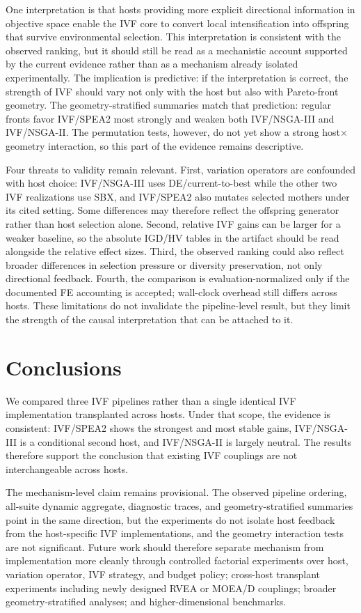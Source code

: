\documentclass[runningheads]{llncs}
\begin{document}
One interpretation is that hosts providing more explicit directional information in objective space enable the IVF core to convert local intensification into offspring that survive environmental selection. This interpretation is consistent with the observed ranking, but it should still be read as a mechanistic account supported by the current evidence rather than as a mechanism already isolated experimentally. The implication is predictive: if the interpretation is correct, the strength of IVF should vary not only with the host but also with Pareto-front geometry. The geometry-stratified summaries match that prediction: regular fronts favor IVF/SPEA2 most strongly and weaken both IVF/NSGA-III and IVF/NSGA-II. The permutation tests, however, do not yet show a strong host$\times$geometry interaction, so this part of the evidence remains descriptive.

Four threats to validity remain relevant. First, variation operators are confounded with host choice: IVF/NSGA-III uses DE/current-to-best while the other two IVF realizations use SBX, and IVF/SPEA2 also mutates selected mothers under its cited setting. Some differences may therefore reflect the offspring generator rather than host selection alone. Second, relative IVF gains can be larger for a weaker baseline, so the absolute IGD/HV tables in the artifact should be read alongside the relative effect sizes. Third, the observed ranking could also reflect broader differences in selection pressure or diversity preservation, not only directional feedback. Fourth, the comparison is evaluation-normalized only if the documented FE accounting is accepted; wall-clock overhead still differs across hosts. These limitations do not invalidate the pipeline-level result, but they limit the strength of the causal interpretation that can be attached to it.

\section{Conclusions}
\label{sec:conclusion}

We compared three IVF pipelines rather than a single identical IVF implementation transplanted across hosts. Under that scope, the evidence is consistent: IVF/SPEA2 shows the strongest and most stable gains, IVF/NSGA-III is a conditional second host, and IVF/NSGA-II is largely neutral. The results therefore support the conclusion that existing IVF couplings are not interchangeable across hosts.

The mechanism-level claim remains provisional. The observed pipeline ordering, all-suite dynamic aggregate, diagnostic traces, and geometry-stratified summaries point in the same direction, but the experiments do not isolate host feedback from the host-specific IVF implementations, and the geometry interaction tests are not significant. Future work should therefore separate mechanism from implementation more cleanly through controlled factorial experiments over host, variation operator, IVF strategy, and budget policy; cross-host transplant experiments including newly designed RVEA or MOEA/D couplings; broader geometry-stratified analyses; and higher-dimensional benchmarks.
\end{document}
